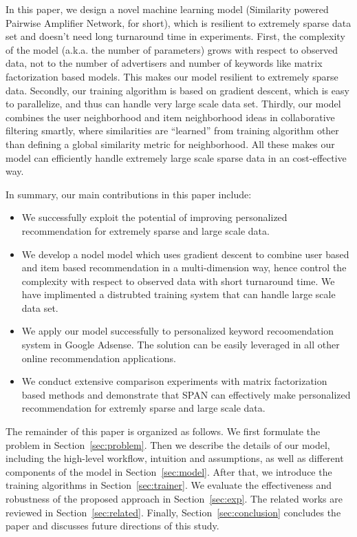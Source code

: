 In this paper, we design a novel machine learning model (Similarity
powered Pairwise Amplifier Network, {\sppan} for short), which is
resilient to extremely sparse data set and doesn't need long
turnaround time in experiments.  First, the complexity of the model
(a.k.a. the number of parameters) grows with respect to observed data,
not to the number of advertisers and number of keywords like matrix
factorization based models. This makes our model resilient to
extremely sparse data. Secondly, our training algorithm is based on
gradient descent, which is easy to parallelize, and thus can handle
very large scale data set. Thirdly, our model combines the user
neighborhood and item neighborhood ideas in collaborative filtering
smartly, where similarities are ``learned'' from training algorithm
other than defining a global similarity metric for neighborhood.  All
these makes our model can efficiently handle extremely large scale
sparse data in an cost-effective way.

In summary, our main contributions in this paper include:
\begin{itemize} \itemsep -1pt
\item We successfully exploit the potential of improving personalized
  recommendation for extremely sparse and large scale data.
\item We develop a nodel model which uses gradient descent to combine
  user based and item based recommendation in a multi-dimension way,
  hence control the complexity with respect to observed data with
  short turnaround time.  We have implimented a distrubted training
  system that can handle large scale data set.
\item We apply our model successfully to personalized keyword
  recoomendation system in Google Adsense. The solution can be easily
  leveraged in all other online recommendation applications.
\item We conduct extensive comparison experiments with matrix
  factorization based methods and demonstrate that SPAN can
  effectively make personalized recommendation for extremly sparse and
  large scale data.
\end{itemize}

The remainder of this paper is organized as follows. We first
formulate the problem in Section~\ref{sec:problem}. Then we describe
the details of our model, including the high-level workflow, intuition
and assumptions, as well as different components of the model in
Section~\ref{sec:model}. After that, we introduce the training
algorithms in Section~\ref{sec:trainer}. We evaluate the effectiveness
and robustness of the proposed approach in Section~\ref{sec:exp}.  The
related works are reviewed in Section~\ref{sec:related}. Finally,
Section~\ref{sec:conclusion} concludes the paper and discusses future
directions of this study.
